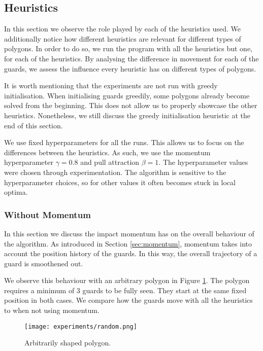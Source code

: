 
\subsection{Heuristics}
In this section we  observe the role played by each of the heuristics used. We  additionally notice how different heuristics are relevant for different types of polygons. In order to do so, we  run the program with all the heuristics but one, for each of the heuristics. By analysing the difference in movement for each of the guards, we assess the influence every heuristic has on different types of polygons.

It is worth mentioning that the experiments are not run with greedy initialisation. When initialising guards greedily, some polygons already become solved from the beginning. This does not allow us to properly showcase the other heuristics. Nonetheless, we still discuss the greedy initialisation heuristic at the end of this section.

We  use fixed hyperparameters for all the runs. This allows us to focus on the differences between the heuristics. 
As such, we  use the momentum hyperparameter $\gamma = 0.8$ and pull attraction $\beta = 1$. The hyperparameter values were chosen through experimentation. The algorithm is sensitive to the hyperparameter choices, so for other values it often becomes stuck in local optima.

\subsubsection{Without Momentum}
In this section we  discuss the impact momentum has on the overall behaviour of the algorithm. As introduced in Section \ref{sec:momentum}, momentum takes into account the position history of the guards. In this way, the overall trajectory of a guard is smoothened out.

We observe this behaviour with an arbitrary polygon in Figure \ref{fig:random}. The polygon requires a minimum of 3 guards to be fully seen. They start at the same fixed position in both cases. We  compare how the guards move with all the heuristics to when not using momentum. 

\begin{figure}[h!]
    \centering
    \texttt{[image: experiments/random.png]}
    \caption{Arbitrarily shaped polygon.}
    \label{fig:random}
\end{figure}

